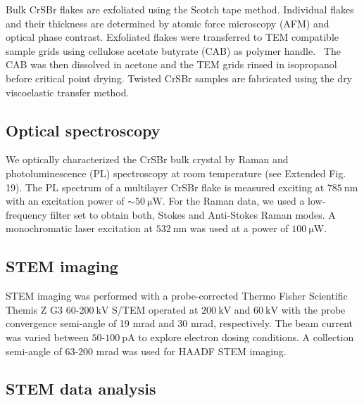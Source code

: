 \documentclass[aps,prl,showpacs,twocolumn,superscriptaddress,floatfix]{revtex4-2}
\begin{document}
Bulk CrSBr flakes are exfoliated using the Scotch tape method. Individual flakes and their thickness are determined by atomic force microscopy (AFM) and optical phase contrast. Exfoliated flakes were transferred to TEM compatible sample grids using cellulose acetate butyrate (CAB) as polymer handle.~\cite{Thomsen.2019} The CAB was then dissolved in acetone and the TEM grids rinsed in isopropanol before critical point drying. Twisted CrSBr samples are fabricated using the dry viscoelastic transfer method.

\subsection{Optical spectroscopy}

We optically characterized the CrSBr bulk crystal by Raman and photoluminescence (PL) spectroscopy at room temperature (see Extended Fig. 19). The PL spectrum of a multilayer CrSBr flake is measured exciting at $\SI{785}{\nano\meter}$ with an excitation power of $\sim \SI{50}{\micro\watt}$. For the Raman data, we used a low-frequency filter set to obtain both, Stokes and Anti-Stokes Raman modes. A monochromatic laser excitation at $\SI{532}{\nano\meter}$ was used at a power of $\SI{100}{\micro\watt}$.

\subsection{STEM imaging}

STEM imaging was performed with a probe-corrected Thermo Fisher Scientific Themis Z G3 $60$-$\SI{200}{\kilo\volt}$ S/TEM operated at $\SI{200}{\kilo\volt}$ and $\SI{60}{\kilo\volt}$ with the probe convergence semi-angle of 19 mrad and 30 mrad, respectively. The beam current was varied between $50$-$\SI{100}{\pico\ampere}$ to explore electron dosing conditions. A collection semi-angle of 63-200 mrad was used for HAADF STEM imaging. %

\subsection{STEM data analysis}
\end{document}
